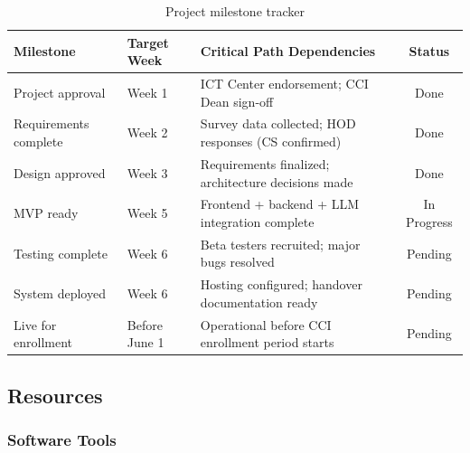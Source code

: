 ﻿\documentclass[12pt, a4paper]{article}
\newcommand{\cellHigh}{\cellcolor{unigreen!25}}
\newcommand{\cellMed}{\cellcolor{accentgold!25}}
\newcommand{\theadrow}{\rowcolor{tableheader}}
\newcommand{\rowalt}{\rowcolor{tablerowalt}}
\begin{document}
\begin{table}[H]
\centering
\begin{tabularx}{\textwidth}{p{3cm}p{2cm}Xc}
\toprule
\theadrow
\textbf{Milestone} & \textbf{Target Week} & \textbf{Critical Path Dependencies} & \textbf{Status} \\
\midrule
Project approval      & Week 1 & ICT Center endorsement; CCI Dean sign-off               & \cellHigh{}Done \\[3pt]
\rowalt
Requirements complete & Week 2 & Survey data collected; HOD responses (CS confirmed)      & \cellHigh{}Done \\[3pt]
Design approved       & Week 3 & Requirements finalized; architecture decisions made      & \cellHigh{}Done \\[3pt]
\rowalt
MVP ready             & Week 5 & Frontend + backend + LLM integration complete            & \cellMed{}In Progress \\[3pt]
Testing complete      & Week 6 & Beta testers recruited; major bugs resolved              & \cellMed{}Pending \\[3pt]
\rowalt
System deployed       & Week 6 & Hosting configured; handover documentation ready         & \cellMed{}Pending \\[3pt]
Live for enrollment   & Before June 1 & Operational before CCI enrollment period starts   & \cellMed{}Pending \\
\bottomrule
\end{tabularx}
\caption{Project milestone tracker}
\end{table}

\subsection{Resources}

\subsubsection*{Software Tools}
\end{document}
